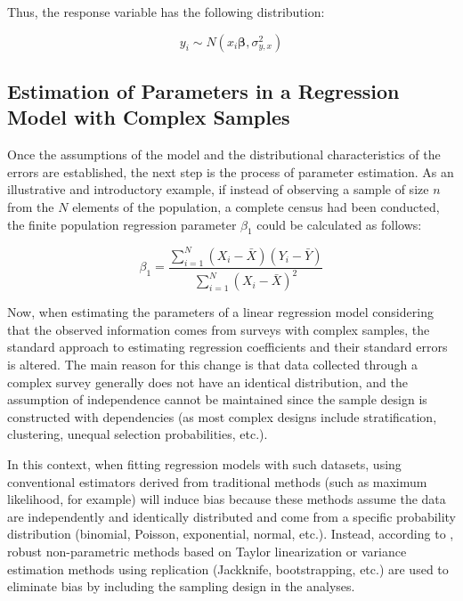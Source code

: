 \documentclass[
  12pt,
]{book}
\begin{document}
Thus, the response variable has the following distribution:

\[
y_{i}  \sim  N\left(x_{i}\boldsymbol{\beta},\sigma_{y,x}^{2}\right)
\]

\hypertarget{estimation-of-parameters-in-a-regression-model-with-complex-samples}{%
\subsection{Estimation of Parameters in a Regression Model with Complex Samples}\label{estimation-of-parameters-in-a-regression-model-with-complex-samples}}

Once the assumptions of the model and the distributional characteristics of the errors are established, the next step is the process of parameter estimation. As an illustrative and introductory example, if instead of observing a sample of size \(n\) from the \(N\) elements of the population, a complete census had been conducted, the finite population regression parameter \(\beta_{1}\) could be calculated as follows:

\[
\beta_{1}  =  \frac{ \sum_{i=1}^{N}\left(X_{i}-\bar{X}\right)\left(Y_{i}-\bar{Y}\right)}{\sum_{i=1}^{N}\left(X_{i}-\bar{X}\right)^{2}}
\]

Now, when estimating the parameters of a linear regression model considering that the observed information comes from surveys with complex samples, the standard approach to estimating regression coefficients and their standard errors is altered. The main reason for this change is that data collected through a complex survey generally does not have an identical distribution, and the assumption of independence cannot be maintained since the sample design is constructed with dependencies (as most complex designs include stratification, clustering, unequal selection probabilities, etc.).

In this context, when fitting regression models with such datasets, using conventional estimators derived from traditional methods (such as maximum likelihood, for example) will induce bias because these methods assume the data are independently and identically distributed and come from a specific probability distribution (binomial, Poisson, exponential, normal, etc.). Instead, according to \citet{Wolter_2007}, robust non-parametric methods based on Taylor linearization or variance estimation methods using replication (Jackknife, bootstrapping, etc.) are used to eliminate bias by including the sampling design in the analyses.
\end{document}
